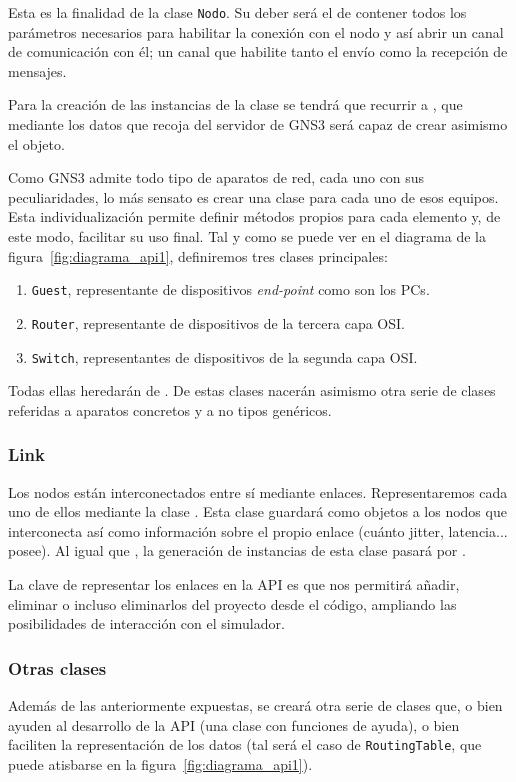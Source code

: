Esta es la finalidad de la clase \texttt{Nodo}. Su deber será el de contener todos los parámetros necesarios para habilitar la conexión con el nodo y así abrir un canal de comunicación con él; un canal que habilite tanto el envío como la recepción de mensajes.

Para la creación de las instancias de la clase se tendrá que recurrir a \GNSCS, que mediante los datos que recoja del servidor de GNS3 será capaz de crear asimismo el objeto.

Como GNS3 admite todo tipo de aparatos de red, cada uno con sus peculiaridades, lo más sensato es crear una clase para cada uno de esos equipos. Esta individualización permite definir métodos propios para cada elemento y, de este modo, facilitar su uso final. Tal y como se puede ver en el diagrama de la figura~\ref{fig:diagrama_api1}, definiremos tres clases principales:
\begin{enumerate}
\item \texttt{Guest}, representante de dispositivos \textit{end-point} como son los PCs.
\item \texttt{Router}, representante de dispositivos de la tercera capa OSI.
\item \texttt{Switch}, representantes de dispositivos de la segunda capa OSI.
\end{enumerate}

Todas ellas heredarán de \NODE. De estas clases nacerán asimismo otra serie de clases referidas a aparatos concretos y a no tipos genéricos.

\subsubsection{Link}
Los nodos están interconectados entre sí mediante enlaces. Representaremos cada uno de ellos mediante la clase \LINK. Esta clase guardará como objetos a los nodos que interconecta así como información sobre el propio enlace (cuánto jitter, latencia... posee). Al igual que \LINK, la generación de instancias de esta clase pasará por \GNSCS.

La clave de representar los enlaces en la API es que nos permitirá añadir, eliminar o incluso eliminarlos del proyecto desde el código, ampliando las posibilidades de interacción con el simulador.

\subsubsection{Otras clases}
Además de las anteriormente expuestas, se creará otra serie de clases que, o bien ayuden al desarrollo de la API (una clase con funciones de ayuda), o bien faciliten la representación de los datos (tal será el caso de \texttt{RoutingTable}, que puede atisbarse en la figura~\ref{fig:diagrama_api1}).

